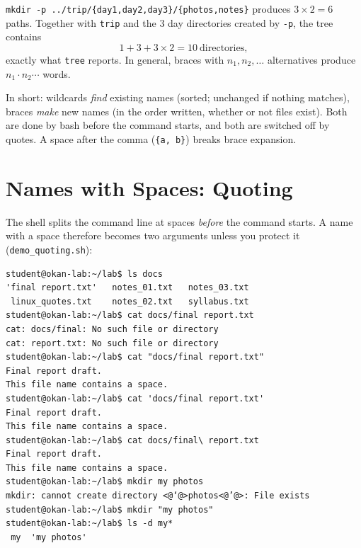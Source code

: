 \documentclass[11pt,a4paper]{article}
\newcommand{\cmd}[1]{\texttt{#1}}
\begin{document}
\begin{example}
\cmd{mkdir -p ../trip/\{day1,day2,day3\}/\{photos,notes\}} produces $3 \times 2 = 6$ paths. Together with \texttt{trip} and the $3$ day directories created by \cmd{-p}, the tree contains
\[
1 + 3 + 3 \times 2 = 10 \ \text{directories},
\]
exactly what \cmd{tree} reports. In general, braces with $n_1, n_2, \dots$ alternatives produce $n_1 \cdot n_2 \cdots$ words.
\end{example}

In short: wildcards \emph{find} existing names (sorted; unchanged if nothing matches), braces \emph{make} new names (in the order written, whether or not files exist).
Both are done by bash before the command starts, and both are switched off by quotes. A space after the comma (\texttt{\{a, b\}}) breaks brace expansion.

\section{Names with Spaces: Quoting}

The shell splits the command line at spaces \emph{before} the command starts. A name with a space therefore becomes two arguments unless you protect it (\cmd{demo\_quoting.sh}):

\begin{lstlisting}[style=term]
student@okan-lab:~/lab$ ls docs
'final report.txt'   notes_01.txt   notes_03.txt
 linux_quotes.txt    notes_02.txt   syllabus.txt
student@okan-lab:~/lab$ cat docs/final report.txt
cat: docs/final: No such file or directory
cat: report.txt: No such file or directory
student@okan-lab:~/lab$ cat "docs/final report.txt"
Final report draft.
This file name contains a space.
student@okan-lab:~/lab$ cat 'docs/final report.txt'
Final report draft.
This file name contains a space.
student@okan-lab:~/lab$ cat docs/final\ report.txt
Final report draft.
This file name contains a space.
student@okan-lab:~/lab$ mkdir my photos
mkdir: cannot create directory <@‘@>photos<@’@>: File exists
student@okan-lab:~/lab$ mkdir "my photos"
student@okan-lab:~/lab$ ls -d my*
 my  'my photos'
\end{lstlisting}
\end{document}
